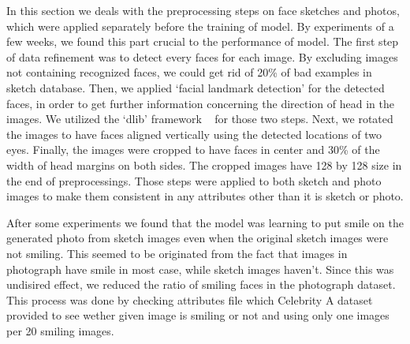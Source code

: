 In this section we deals with the preprocessing steps on face sketches and photos, which were applied separately before the training of model. By experiments of a few weeks, we found this part crucial to the performance of model. 
The first step of data refinement was to detect every faces for each image. By excluding images not containing recognized faces, we could get rid of 20\% of bad examples in sketch database. Then, we applied `facial landmark detection' for the detected faces, in order to get further information concerning the direction of head in the images. We utilized the `dlib' framework ~\cite{dlib} for those two steps.
Next, we rotated the images to have faces aligned vertically using the detected locations of two eyes.
Finally, the images were cropped to have faces in center and 30\% of the width of head margins on both sides. The cropped images have 128 by 128 size in the end of preprocessings. Those steps were applied to both sketch and photo images to make them consistent in any attributes other than it is sketch or photo. 

After some experiments we found that the model was learning to put smile on the generated photo from sketch images even when the original sketch images were not smiling. This seemed to be originated from the fact that images in photograph have smile in most case, while sketch images haven't. Since this was undisired effect, we reduced the ratio of smiling faces in the photograph dataset. This process was done by checking attributes file which Celebrity A dataset provided to see wether given image is smiling or not and using only one images per 20 smiling images.


\endinput
